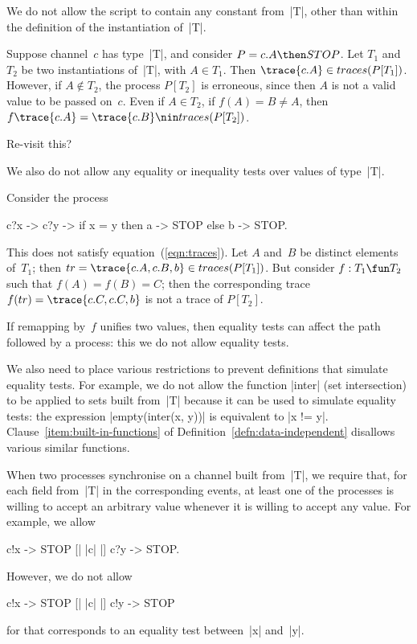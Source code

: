 We do not allow the script to contain any constant from~|T|, other than within
the definition of the instantiation of~|T|.  
\begin{example}
Suppose channel~$c$ has type~|T|, and consider $P = c.A \then STOP$.
Let $T_1$ and $T_2$ be two instantiations of~|T|, with $A \in T_1$.  Then 
$\trace{c.A} \in traces(P[T_1])$.  However, if $A \nin T_2$, the process
$P[T_2]$ is erroneous, since then $A$ is not a valid value to be passed
on~$c$.  Even if $A \in T_2$, if $f(A) = B \ne A$, then $f\trace{c.A}  =
\trace{c.B} \nin traces(P[T_2])$.
\end{example}

\framebox{**} Re-visit this?


We also do not allow any equality or inequality tests over values of type~|T|.
%
\begin{example}
Consider the process
\begin{cspm}
c?x -> c?y -> if x = y then a -> STOP else b -> STOP.
\end{cspm}
%
This does not satisfy equation~(\ref{eqn:traces}).  Let $A$ and~$B$ be
distinct elements of~$T_1$; then $tr = \trace{c.A, c.B, b} \in
traces(P[T_1])$.  But consider $f: T_1 \fun T_2$ such that $f(A) = f(B) = C$;
then the corresponding trace $f(tr) = \trace{c.C, c.C, b}$ is not a trace of
$P[T_2]$.
\end{example}
%
If remapping by~$f$ unifies two values, then equality tests can affect
the path followed by a process: this we do not allow equality tests. 

We also need to place various restrictions to prevent definitions that
simulate equality tests.  For example, we do not allow the function |inter|
(set intersection) to be applied to sets built from~|T| because it can be used
to simulate equality tests: the expression |empty(inter({x}, {y}))| is
equivalent to |x != y|.  Clause~\ref{item:built-in-functions} of
Definition~\ref{defn:data-independent} disallows various similar functions. 

When two processes synchronise on a channel built
from~|T|, we require that, for each field from~|T| in the corresponding
events, at least one of the processes is willing to accept an arbitrary value
whenever it is willing to accept any value.  For example, we allow
\begin{cspm}
c!x -> STOP [| {|c|} |] c?y -> STOP.
\end{cspm}
However, we do not allow 
\begin{cspm}
c!x -> STOP [| {|c|} |] c!y -> STOP
\end{cspm}
for that corresponds to an equality test between~|x| and~|y|. 

